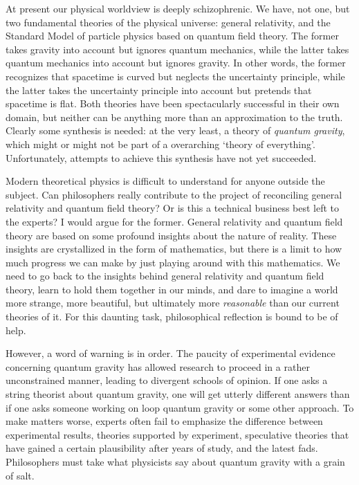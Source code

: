 \documentclass[12pt,amsfonts]{article}
\begin{document}
At present our physical worldview is deeply schizophrenic.  We have, not
one, but two fundamental theories of the physical universe: general
relativity, and the Standard Model of particle physics based on quantum
field theory.  The former takes gravity into account but ignores quantum
mechanics, while the latter takes quantum mechanics into account but
ignores gravity.  In other words, the former recognizes that spacetime
is curved but neglects the uncertainty principle, while the latter takes
the uncertainty principle into account but pretends that spacetime is
flat.  Both theories have been spectacularly successful in their own
domain, but neither can be anything more than an approximation to the
truth.   Clearly some synthesis is needed: at the very least, a theory 
of {\it quantum gravity}, which might or might not be part of a
overarching `theory of everything'.   Unfortunately, attempts to achieve
this synthesis have not yet succeeded.

Modern theoretical physics is difficult to understand for anyone outside
the subject.  Can philosophers really contribute to the project of
reconciling general relativity and quantum field theory?  Or is this a
technical business best left to the experts?  I would argue for the
former.  General relativity and quantum field theory are based on some
profound insights about the nature of reality.    These insights are
crystallized in the form of mathematics, but there is a limit to how
much progress we can make by just playing around with this mathematics.
We need to go back to the insights behind general relativity and quantum
field theory, learn to hold them together in our minds, and dare to
imagine a world more strange, more beautiful, but ultimately more {\it
reasonable} than our current theories of it.  For this daunting task,
philosophical reflection is bound to be of help.  

However, a word of warning is in order.  The paucity of experimental
evidence concerning quantum gravity has allowed research to proceed in a
rather unconstrained manner, leading to divergent schools of opinion. 
If one asks a string theorist about quantum gravity, one will get
utterly different answers than if one asks someone working on loop
quantum gravity or some other approach.  To make matters worse, experts
often fail to emphasize the difference between experimental results,
theories supported by experiment, speculative theories that have gained
a certain plausibility after years of study, and the latest fads. 
Philosophers must take what physicists say about quantum gravity with a
grain of salt.  
\end{document}
